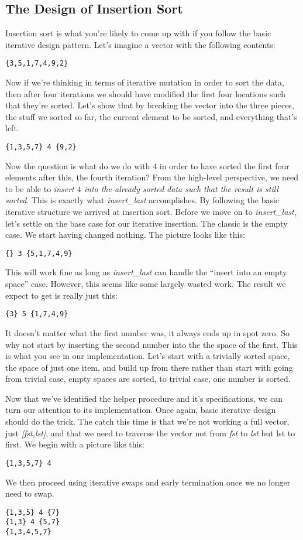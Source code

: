 \documentclass[]{tufte-handout}
\begin{document}
\subsection{The Design of Insertion Sort}

Insertion sort is what you're likely to come up with if you follow the basic iterative design pattern. Let's imagine a vector with the following contents:
\begin{verbatim}
{3,5,1,7,4,9,2}
\end{verbatim}
Now if we're thinking in terms of iterative mutation in order to sort the data, then after four iterations we should have modified the first four locations such that they're sorted.  Let's show that by breaking the vector into the three pieces, the stuff we sorted so far, the current element to be sorted, and everything that's left.
\begin{verbatim}
{1,3,5,7} 4 {9,2}
\end{verbatim}
Now the question is what do we do with $4$ in order to have sorted the first four elements after this, the fourth iteration?  From the high-level perspective, we need to be able to \textit{insert $4$ into the already sorted data such that the result is still sorted}.  This is exactly what \textit{insert\_last} accomplishes. By following the basic iterative structure we arrived at insertion sort. Before we move on to \textit{insert\_last}, let's settle on the base case for our iterative insertion. The classic is the empty case. We start having changed nothing. The picture looks like this:
\begin{verbatim}
{} 3 {5,1,7,4,9}
\end{verbatim}
This will work fine as long as \textit{insert\_last} can handle the ``insert into an empty space'' case. However, this seems like some largely wasted work.  The result we expect to get is really just this:
\begin{verbatim}
{3} 5 {1,7,4,9}
\end{verbatim}
It doesn't matter what the first number was, it always ends up in spot zero.  So why not start by inserting the second number into the the space of the first.  This is what you see in our implementation. Let's start with a trivially sorted space, the space of just one item, and build up from there rather than start with going from trivial case, empty spaces are sorted, to trivial case, one number is sorted. 

Now that we've identified the helper procedure and it's specifications, we can turn our attention to its implementation. Once again, basic iterative design should do the trick. The catch this time is that we're not working a full vector, just \textit{[fst,lst]}, and that we need to traverse the vector not from \textit{fst} to \textit{lst} but lst to first. We begin with a picture like this:
\begin{verbatim}
{1,3,5,7} 4 
\end{verbatim}
We then proceed using iterative swaps and early termination once we no longer need to swap. 
\begin{verbatim}
{1,3,5} 4 {7} 
{1,3} 4 {5,7} 
{1,3,4,5,7}
\end{verbatim}
\end{document}
